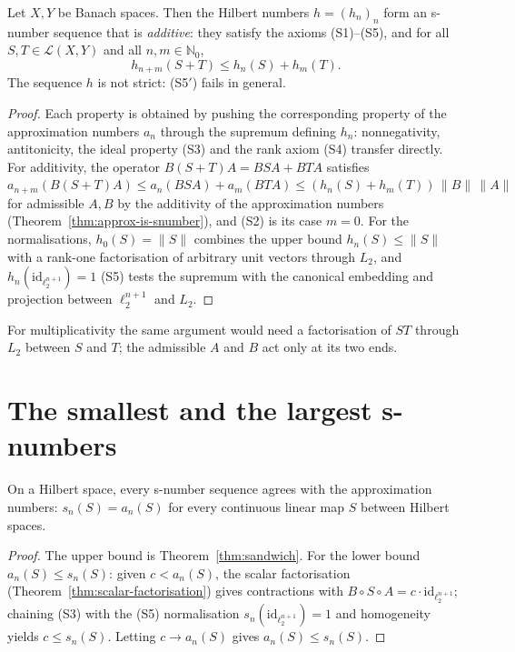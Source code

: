 \begin{proposition}
\label{prop:hilbert-is-snumber}
\leanok
{}
Let $X, Y$ be Banach spaces. Then the Hilbert numbers $h = (h_n)_n$ form an
s-number sequence that is \emph{additive}: they satisfy the axioms
(S1)--(S5), and for all $S, T \in \mathcal{L}(X, Y)$ and all
$n, m \in \mathbb{N}_0$,
\[
  h_{n+m}(S + T) \le h_n(S) + h_m(T).
\]
The sequence $h$ is not strict: (S5$'$) fails in general.
\end{proposition}
\begin{proof}
\leanok
{}
Each property is obtained by pushing the corresponding property of the
approximation numbers $a_n$ through the supremum defining $h_n$:
nonnegativity, antitonicity, the ideal property (S3) and the rank axiom
(S4) transfer directly. For additivity, the operator
$B (S + T) A = BSA + BTA$ satisfies
$a_{n+m}(B (S + T) A) \le a_n(BSA) + a_m(BTA)
\le (h_n(S) + h_m(T)) \, \|B\| \, \|A\|$ for admissible $A, B$ by the
additivity of the approximation numbers
(Theorem~\ref{thm:approx-is-snumber}), and (S2) is its case $m = 0$. For the
normalisations, $h_0(S) = \|S\|$ combines the upper bound
$h_n(S) \le \|S\|$ with a rank-one factorisation of arbitrary unit vectors
through $L_2$, and $h_n(\mathrm{id}_{\ell_2^{n+1}}) = 1$ (S5) tests the
supremum with the canonical embedding and projection between
$\ell_2^{n+1}$ and $L_2$.
\end{proof}

For multiplicativity the same argument would need a factorisation of $S T$
through $L_2$ between $S$ and $T$; the admissible $A$ and $B$ act only at its
two ends.

\chapter{The smallest and the largest s-numbers}
\label{ch:sandwich}

\begin{theorem}
\label{thm:all-eq-on-hilbert}
\leanok
{}
On a Hilbert space, every s-number sequence agrees with the
approximation numbers: $s_n(S) = a_n(S)$ for every continuous linear map
$S$ between Hilbert spaces.
\end{theorem}
\begin{proof}
\leanok
The upper bound is Theorem~\ref{thm:sandwich}. For the lower bound
$a_n(S) \le s_n(S)$: given $c < a_n(S)$, the scalar factorisation
(Theorem~\ref{thm:scalar-factorisation}) gives contractions with
$B \circ S \circ A = c \cdot \mathrm{id}_{\ell_2^{n+1}}$; chaining (S3) with
the (S5) normalisation $s_n(\mathrm{id}_{\ell_2^{n+1}}) = 1$ and homogeneity
yields $c \le s_n(S)$. Letting $c \to a_n(S)$ gives $a_n(S) \le s_n(S)$.
\end{proof}

